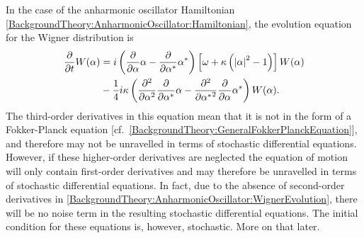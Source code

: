 In the case of the anharmonic oscillator Hamiltonian \eqref{BackgroundTheory:AnharmonicOscillator:Hamiltonian}, the evolution equation for the Wigner distribution is
\begin{align}
    \label{BackgroundTheory:AnharmonicOscillator:WignerEvolution}
    \begin{split}
        \frac{\partial}{\partial t} W(\alpha) &=  i\left( \frac{\partial}{\partial \alpha} \alpha - \frac{\partial}{\partial \alpha^*} \alpha^*\right) \left[\omega + \kappa\left(\abs{\alpha}^2 - 1\right) \right] W(\alpha)\\
        &-\frac{1}{4}i \kappa \left(\frac{\partial^2}{\partial \alpha^2}\frac{\partial}{\partial \alpha^*}\alpha - \frac{\partial^2}{\partial {\alpha^*}^2} \frac{\partial}{\partial \alpha} \alpha^*\right) W(\alpha).
    \end{split}
\end{align}
The third-order derivatives in this equation mean that it is not in the form of a Fokker-Planck equation [cf.\ \eqref{BackgroundTheory:GeneralFokkerPlanckEquation}], and therefore may not be unravelled in terms of stochastic differential equations.  However, if these higher-order derivatives are neglected the equation of motion will only contain first-order derivatives and may therefore be unravelled in terms of stochastic differential equations.  In fact, due to the absence of second-order derivatives in \eqref{BackgroundTheory:AnharmonicOscillator:WignerEvolution}, there will be no noise term in the resulting stochastic differential equations.  The initial condition for these equations is, however, stochastic.  More on that later.


